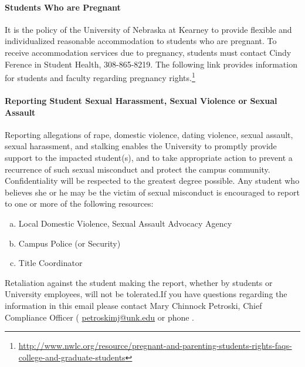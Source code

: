 \documentclass[12pt]{article}
\newcounter{ex}\setcounter{ex}{0}
\newenvironment{alphalist}{
  \begin{enumerate}[(a)]
    \addtolength{\itemsep}{-0.5\itemsep}}
  {\end{enumerate}}
\newcommand{\RomanNumeralCaps}[1]
      {\MakeUppercase{\romannumeral #1}}
\begin{document}
\paragraph{Students Who are Pregnant} It is the policy of the University of Nebraska at Kearney to provide flexible and individualized reasonable accommodation to students who are pregnant. To receive accommodation services due to pregnancy, students must contact Cindy Ference in Student Health, 308-865-8219. The following link provides information for students and faculty regarding pregnancy rights.\footnote{\tiny  \url{http://www.nwlc.org/resource/pregnant-and-parenting-students-rights-faqs-college-and-graduate-students}}

\paragraph{Reporting Student Sexual Harassment, Sexual Violence or Sexual Assault} Reporting allegations of rape, domestic violence, dating violence, sexual assault, sexual harassment, and stalking enables the University to promptly provide support to the impacted student(s), and to take appropriate action to prevent a recurrence of such sexual misconduct and protect the campus community. Confidentiality will be respected to the greatest degree possible. Any student who believes she or he may be the victim of sexual misconduct is encouraged to report to one or more of the following resources:
\begin{alphalist}
\item Local Domestic Violence, Sexual Assault Advocacy Agency 

\item Campus Police (or Security) 

\item Title \RomanNumeralCaps{9} Coordinator 

\end{alphalist}
Retaliation against the student making the report, whether by students or University employees, will not be tolerated.If you have questions regarding the information in this email please 
contact Mary Chinnock Petroski, Chief Compliance Officer (
   \href{mailto:petroskimj@unk.edu}{petroskimj@unk.edu} 
    or phone .
\end{document}

